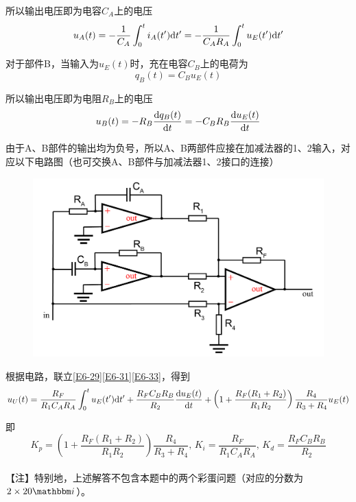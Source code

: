 \documentclass[10pt,a4paper,onecolumn,UTF8]{ctexart}
\begin{document}
	所以输出电压即为电容$C_A$上的电压
	\begin{equation}\label{E6-31}
		u_A(t)=-\frac{1}{C_A}\int_0^t i_A(t')\mathrm{d} t'=-\frac{1}{C_AR_A}\int_0^t u_E(t')\mathrm{d} t'
	\end{equation}
	
	对于部件B，当输入为$u_E(t)$时，充在电容$C_B$上的电荷为
	\begin{equation}
		q_B(t)=C_Bu_E(t)
	\end{equation}
	
	所以输出电压即为电阻$R_B$上的电压
	\begin{equation}\label{E6-33}
		u_B(t)=-R_B\frac{\mathrm{d} q_B(t)}{\mathrm{d} t}=-C_BR_B\frac{\mathrm{d} u_E(t)}{\mathrm{d} t}
	\end{equation}
	
	由于A、B部件的输出均为负号，所以A、B两部件应接在加减法器的1、2输入，对应以下电路图（也可交换A、B部件与加减法器1、2接口的连接）
	
	\begin{figure}[!tb]
		\centering
		\includegraphics[width=0.7\columnwidth]{FB.png}
	\end{figure}
	
	根据电路，联立\eqref{E6-29}\eqref{E6-31}\eqref{E6-33}，得到
	\begin{equation}
		u_U(t)=\frac{R_F}{R_1C_AR_A}\int_0^t u_E(t')\mathrm{d} t'+\frac{R_FC_BR_B}{R_2}\frac{\mathrm{d} u_E(t)}{\mathrm{d} t}+\left(1+\frac{R_F(R_1+R_2)}{R_1R_2}\right)\frac{R_4}{R_3+R_4}u_E(t)
	\end{equation}
	
	即
	\begin{equation}
		K_p=\left(1+\frac{R_F(R_1+R_2)}{R_1R_2}\right)\frac{R_4}{R_3+R_4},\,K_i=\frac{R_F}{R_1C_AR_A},\,K_d=\frac{R_FC_BR_B}{R_2}
	\end{equation}\\
	
	【注】特别地，上述解答不包含本题中的两个彩蛋问题（对应的分数为$2\times20\ui$）。
	
	
	
	
	
	
	
	
	
	
	
	
\end{document}
